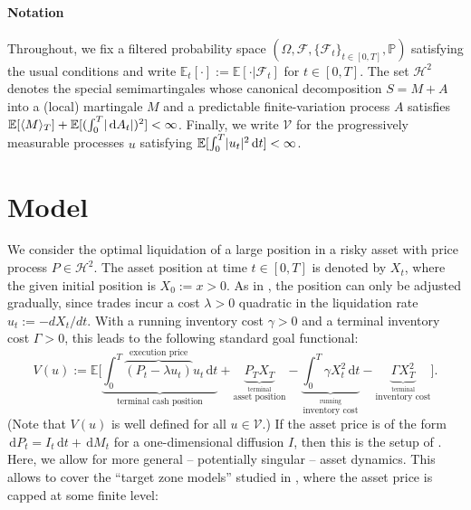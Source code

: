 \documentclass[11pt]{article}
\numberwithin{equation}{section}
\theoremstyle{definition}
\theoremstyle{remark}
\newcommand{\E}{\mathbb{E}} %
\renewcommand{\P}{\mathbb{P}} %
\newcommand{\F}{\mathcal{F}} %
\DeclarePairedDelimiter{\abs}{\lvert}{\rvert} %
\newcommand{\de}{\,\mathrm{d}}
\begin{document}
\paragraph{Notation}

Throughout, we fix a filtered probability space $(\Omega, \F, \{\F_t\}_{t\in[0,T]}, \P)$ satisfying the usual conditions and write $\E_t[\cdot] := \E[\cdot \vert \F_t]$ for $t\in[0,T]$. The set $\mathcal{H}^2$ denotes the special semimartingales whose canonical decomposition $S=M+A$ into a (local) martingale $M$ and a predictable finite-variation process $A$ satisfies $\E[\langle M\rangle_T] + \E[(\int_0^T \abs{\de A_t})^2] < \infty$. Finally, we write $\mathcal{V}$ for the progressively measurable processes $u$ satisfying $\E[\int_0^T \abs{u_t}^2 \de t] < \infty$.


\section{Model}\label{s:model}

We consider the optimal liquidation of a large position in a risky asset with price process $P \in \mathcal{H}^2$. The asset position at time $t \in [0,T]$ is denoted by $X_t$, where the given initial position is $X_0:=x>0$. As in \cite{almgren2001optimal}, the position can only be adjusted gradually, since trades incur a cost $\lambda>0$ quadratic in the liquidation rate $u_t := -dX_t/dt$. With a running inventory cost $\gamma>0$ and a terminal inventory cost $\Gamma>0$, this leads to the following standard goal functional:
\begin{equation}\label{eq:goal}
 V(u):= \E\Bigg[\underbrace{\int_0^T \overbrace{(P_t - \lambda u_t)}^{\textrm{execution price}} u_t \de t}_{\textrm{terminal cash position}} + \underbrace{P_T X_T}_{\stackrel{\textrm{terminal}}{\textrm{asset position}}} - \underbrace{\int_0^T \gamma X_t^2 \de t}_{\stackrel{\textrm{running}}{\textrm{inventory cost}}} - \underbrace{\Gamma X_T^2}_{\stackrel{\textrm{terminal}}{\textrm{inventory cost}}} \Bigg].
\end{equation}
(Note that $V(u)$ is well defined for all $u\in\mathcal V$.)
If the asset price is of the form $\de P_t = I_t \de t + \de M_t$ for a one-dimensional diffusion $I$, then this is the setup of \cite{lehalle2017incorporating}. Here, we allow for more general -- potentially singular -- asset dynamics. This allows to cover the ``target zone models'' studied in \cite{neuman.schied.16}, where the asset price is capped at some finite level: 
\end{document}

